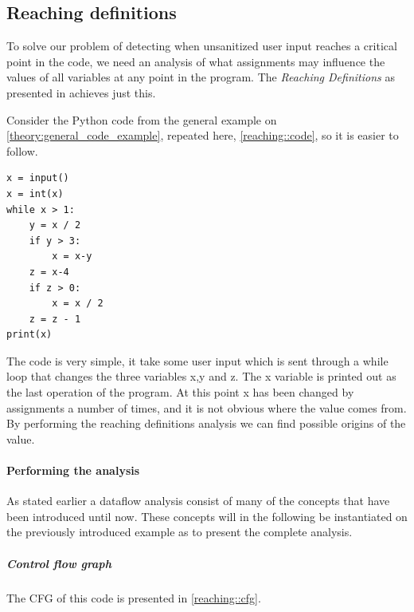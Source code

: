 \subsection{Reaching definitions}
To solve our problem of detecting when unsanitized user input reaches a critical point in the code, we need an analysis of what assignments may influence the values of all variables at any point in the program.
The \emph{Reaching Definitions} as presented in \citet[p.~26]{schwartzbach} achieves just this.

Consider the Python code from the general example on \cref{theory:general_code_example}, repeated here, \cref{reaching::code}, so it is easier to follow.

\begin{lstlisting}[style=python, caption={General code example repeated here from \cref{theory:general_code_example}}, label=reaching::code]
x = input()
x = int(x)
while x > 1:
    y = x / 2
    if y > 3:
        x = x-y
    z = x-4
    if z > 0:
        x = x / 2
    z = z - 1
print(x)
\end{lstlisting}

The code is very simple, it take some user input which is sent through a while loop that changes the three variables x,y and z.
The x variable is printed out as the last operation of the program.
At this point x has been changed by assignments a number of times, and it is not obvious where the value comes from.
By performing the reaching definitions analysis we can find possible origins of the value.

\paragraph{Performing the analysis}
As stated earlier a dataflow analysis consist of many of the concepts that have been introduced until now.
These concepts will in the following be instantiated on the previously introduced example as to present the complete analysis.

\subparagraph{Control flow graph}
The CFG of this code is presented in \cref{reaching::cfg}.

